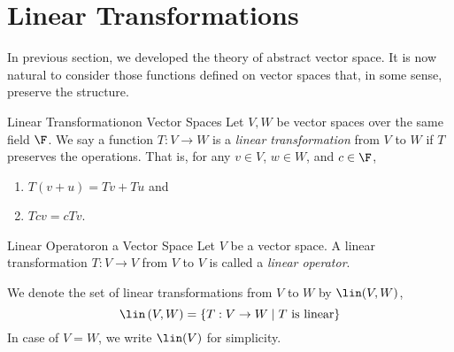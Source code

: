 \documentclass[linearalgebra]{subfiles}
\begin{document}

    \section{Linear Transformations}

    \begin{remark}
        In previous section, we developed the theory of abstract vector space. It is now natural to consider those functions defined on vector spaces that, in some sense, preserve the structure.
    \end{remark}

    \begin{definition}{Linear Transformation}{on Vector Spaces}
        Let $V, W$ be vector spaces over the same field $\F$. We say a function $T:V\to W$ is a \emph{linear transformation} from $V$ to $W$ if $T$ preserves the operations. That is, for any $v\in V$, $w\in W$, and $c\in \F$,
        \begin{enumerate}
            \item $T(v+u) = Tv+Tu$ and
            \item $Tcv = cTv$.
        \end{enumerate}
    \end{definition}

    \begin{definition}{Linear Operator}{on a Vector Space}
        Let $V$ be a vector space. A linear transformation $T:V\to V$ from $V$ to $V$ is called a \emph{linear operator}.
    \end{definition}

    \begin{remark}
        We denote the set of linear transformations from $V$ to $W$ by $\lin(V,W)$,
        \begin{equation*}
            \lin\left( V,W \right) = \left\lbrace T:V\to W\mid T\text{ is linear} \right\rbrace 
        \end{equation*}
        In case of $V=W$, we write $\lin(V)$ for simplicity.
    \end{remark}
\end{document}
